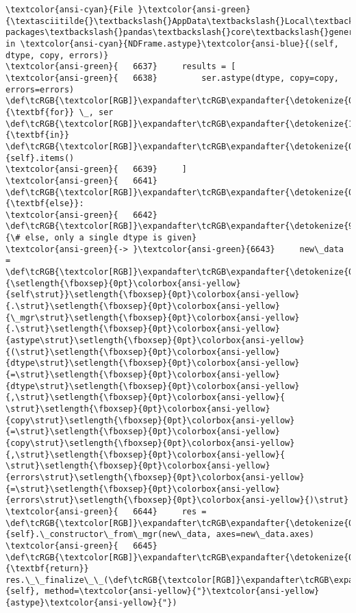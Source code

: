 \documentclass[11pt]{article}
\begin{document}
\begin{Verbatim}[commandchars=\\\{\}, frame=single, framerule=2mm, rulecolor=\color{outerrorbackground}]
\textcolor{ansi-cyan}{File }\textcolor{ansi-green}{\textasciitilde{}\textbackslash{}AppData\textbackslash{}Local\textbackslash{}Programs\textbackslash{}Python\textbackslash{}Python313\textbackslash{}Lib\textbackslash{}site-packages\textbackslash{}pandas\textbackslash{}core\textbackslash{}generic.py:6643}, in \textcolor{ansi-cyan}{NDFrame.astype}\textcolor{ansi-blue}{(self, dtype, copy, errors)}
\textcolor{ansi-green}{   6637}     results = [
\textcolor{ansi-green}{   6638}         ser.astype(dtype, copy=copy, errors=errors) \def\tcRGB{\textcolor[RGB]}\expandafter\tcRGB\expandafter{\detokenize{0,135,0}}{\textbf{for}} \_, ser \def\tcRGB{\textcolor[RGB]}\expandafter\tcRGB\expandafter{\detokenize{175,0,255}}{\textbf{in}} \def\tcRGB{\textcolor[RGB]}\expandafter\tcRGB\expandafter{\detokenize{0,135,0}}{self}.items()
\textcolor{ansi-green}{   6639}     ]
\textcolor{ansi-green}{   6641} \def\tcRGB{\textcolor[RGB]}\expandafter\tcRGB\expandafter{\detokenize{0,135,0}}{\textbf{else}}:
\textcolor{ansi-green}{   6642}     \def\tcRGB{\textcolor[RGB]}\expandafter\tcRGB\expandafter{\detokenize{95,135,135}}{\# else, only a single dtype is given}
\textcolor{ansi-green}{-> }\textcolor{ansi-green}{6643}     new\_data = \def\tcRGB{\textcolor[RGB]}\expandafter\tcRGB\expandafter{\detokenize{0,135,0}}{\setlength{\fboxsep}{0pt}\colorbox{ansi-yellow}{self\strut}}\setlength{\fboxsep}{0pt}\colorbox{ansi-yellow}{.\strut}\setlength{\fboxsep}{0pt}\colorbox{ansi-yellow}{\_mgr\strut}\setlength{\fboxsep}{0pt}\colorbox{ansi-yellow}{.\strut}\setlength{\fboxsep}{0pt}\colorbox{ansi-yellow}{astype\strut}\setlength{\fboxsep}{0pt}\colorbox{ansi-yellow}{(\strut}\setlength{\fboxsep}{0pt}\colorbox{ansi-yellow}{dtype\strut}\setlength{\fboxsep}{0pt}\colorbox{ansi-yellow}{=\strut}\setlength{\fboxsep}{0pt}\colorbox{ansi-yellow}{dtype\strut}\setlength{\fboxsep}{0pt}\colorbox{ansi-yellow}{,\strut}\setlength{\fboxsep}{0pt}\colorbox{ansi-yellow}{ \strut}\setlength{\fboxsep}{0pt}\colorbox{ansi-yellow}{copy\strut}\setlength{\fboxsep}{0pt}\colorbox{ansi-yellow}{=\strut}\setlength{\fboxsep}{0pt}\colorbox{ansi-yellow}{copy\strut}\setlength{\fboxsep}{0pt}\colorbox{ansi-yellow}{,\strut}\setlength{\fboxsep}{0pt}\colorbox{ansi-yellow}{ \strut}\setlength{\fboxsep}{0pt}\colorbox{ansi-yellow}{errors\strut}\setlength{\fboxsep}{0pt}\colorbox{ansi-yellow}{=\strut}\setlength{\fboxsep}{0pt}\colorbox{ansi-yellow}{errors\strut}\setlength{\fboxsep}{0pt}\colorbox{ansi-yellow}{)\strut}
\textcolor{ansi-green}{   6644}     res = \def\tcRGB{\textcolor[RGB]}\expandafter\tcRGB\expandafter{\detokenize{0,135,0}}{self}.\_constructor\_from\_mgr(new\_data, axes=new\_data.axes)
\textcolor{ansi-green}{   6645}     \def\tcRGB{\textcolor[RGB]}\expandafter\tcRGB\expandafter{\detokenize{0,135,0}}{\textbf{return}} res.\_\_finalize\_\_(\def\tcRGB{\textcolor[RGB]}\expandafter\tcRGB\expandafter{\detokenize{0,135,0}}{self}, method=\textcolor{ansi-yellow}{"}\textcolor{ansi-yellow}{astype}\textcolor{ansi-yellow}{"})


\end{Verbatim}
\end{document}
